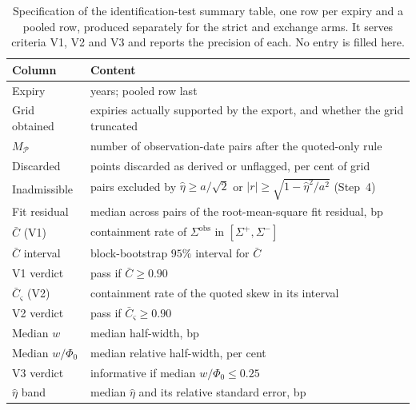 \documentclass[../../../main.tex]{subfiles}
\begin{document}
\begin{table}[htbp]
\centering\small
\caption{Specification of the identification-test summary table, one row per expiry and a pooled row, produced separately for the strict and exchange arms. It serves criteria V1, V2 and V3 and reports the precision of each. No entry is filled here.}
\label{tab:usd-ident-summary}
\begin{tabular}{@{}ll@{}}
\toprule
Column & Content \\
\midrule
Expiry & years; pooled row last \\
Grid obtained & expiries actually supported by the export, and whether the grid truncated \\
$M_{\mathcal P}$ & number of observation-date pairs after the quoted-only rule \\
Discarded & points discarded as derived or unflagged, per cent of grid \\
Inadmissible & pairs excluded by $\hat\eta\ge a/\sqrt2$ or $|r|\ge\sqrt{1-\hat\eta^2/a^2}$ (Step~4) \\
Fit residual & median across pairs of the root-mean-square fit residual, bp \\
$\bar C$ (V1) & containment rate of $\Sigma^{\mathrm{obs}}$ in $[\Sigma^+,\Sigma^-]$ \\
$\bar C$ interval & block-bootstrap $95\%$ interval for $\bar C$ \\
V1 verdict & pass if $\bar C\ge0.90$ \\
$\bar C_{\varsigma}$ (V2) & containment rate of the quoted skew in its interval \\
V2 verdict & pass if $\bar C_\varsigma\ge0.90$ \\
Median $w$ & median half-width, bp \\
Median $w/\Phi_0$ & median relative half-width, per cent \\
V3 verdict & informative if median $w/\Phi_0\le0.25$ \\
$\hat\eta$ band & median $\hat\eta$ and its relative standard error, bp \\
\bottomrule
\end{tabular}
\end{table}
\end{document}
